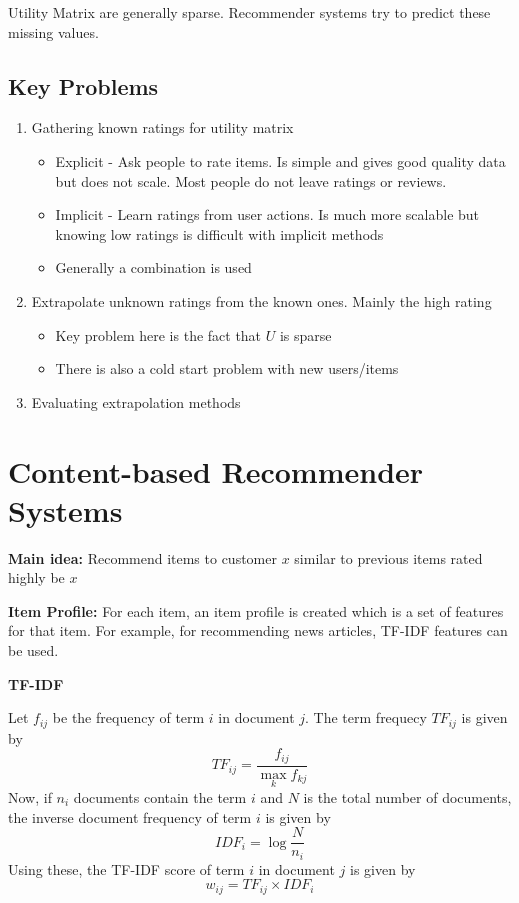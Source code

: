 \documentclass{article}
\begin{document}
Utility Matrix are generally sparse. Recommender systems try to predict these missing values.

\subsection{Key Problems}
\begin{enumerate}
    \item Gathering known ratings for utility matrix
    \begin{itemize}
        \item Explicit - Ask people to rate items. Is simple and gives good quality data but does not scale. Most people do not leave ratings or reviews.
        \item Implicit - Learn ratings from user actions. Is much more scalable but knowing low ratings is difficult with implicit methods
        \item Generally a combination is used
    \end{itemize}
    \item Extrapolate unknown ratings from the known ones. Mainly the high rating
    \begin{itemize}
        \item Key problem here is the fact that $U$ is sparse
        \item There is also a cold start problem with new users/items
    \end{itemize}
    \item Evaluating extrapolation methods
\end{enumerate}

\section{Content-based Recommender Systems}
\textbf{Main idea:} Recommend items to customer $x$ similar to previous items rated highly be $x$

\textbf{Item Profile:} For each item, an item profile is created which is a set of features for that item. For example, for recommending news articles, TF-IDF features can be used.

\textbf{TF-IDF}

Let $f_{ij}$ be the frequency of term $i$ in document $j$. The term frequecy $TF_{ij}$ is given by $$TF_{ij} = \frac{f_{ij}}{\max_k f_{kj}}$$
Now, if $n_i$ documents contain the term $i$ and $N$ is the total number of documents, the inverse document frequency of term $i$ is given by $$IDF_i = \log\frac{N}{n_i}$$
Using these, the TF-IDF score of term $i$ in document $j$ is given by $$w_{ij} = TF_{ij} \times IDF_i$$
\end{document}
